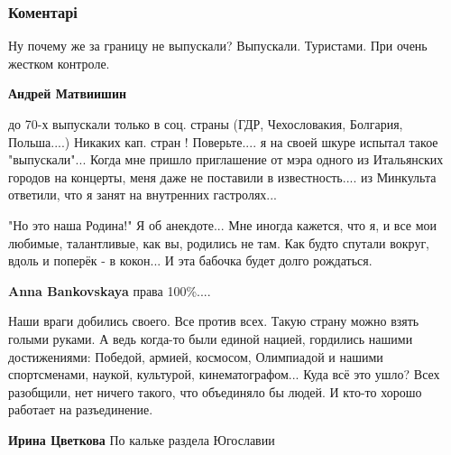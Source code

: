  
 
 
 
 
\subsubsection{Коментарі}

\begin{itemize} %
Ну почему же за границу не выпускали? Выпускали. Туристами. При очень жестком контроле.

\begin{itemize} %
\textbf{Андрей Матвиишин} 

до 70-х выпускали только в соц. страны (ГДР, Чехословакия, Болгария, Польша....)
Никаких кап. стран ! Поверьте.... я на своей шкуре испытал такое "выпускали"...
Когда мне пришло приглашение от мэра одного из Итальянских городов на концерты,
меня даже не поставили в известность.... из Минкульта ответили, что я занят на
внутренних гастролях...

\end{itemize} %


"Но это наша Родина!" Я об анекдоте... Мне иногда кажется, что я, и все мои
любимые, талантливые, как вы, родились не там. Как будто спутали вокруг, вдоль
и поперёк - в кокон... И эта бабочка будет долго рождаться.

\textbf{Anna Bankovskaya} права 100\%....


Наши враги добились своего. Все против всех. Такую страну можно взять голыми
руками. А ведь когда-то были единой нацией, гордились нашими
достижениями: Победой, армией, космосом, Олимпиадой и нашими спортсменами,
наукой, культурой, кинематографом... Куда всё это ушло? Всех разобщили, нет
ничего такого, что объединяло бы людей. И кто-то хорошо работает на
разъединение.

\begin{itemize} %
\textbf{Ирина Цветкова} По кальке раздела Югославии


\end{itemize}
\end{itemize}
